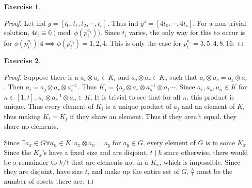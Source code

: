 \documentclass[11pt]{article}
\theoremstyle{definition}
\newtheorem{exercise}{{Exercise}}
\newcommand{\ind}{\text{ind }}
\begin{document}
\begin{exercise}
	\begin{proof}
		Let \(\ind y = [t_0, t_1, t_2, \cdots , t_s] \). Thus \(\ind y^4 = [4t_0, \cdots, 4t_s] \). For a non-trivial solution, \(4t_i \equiv 0 \pmod{\phi(p_i^{a_i})} \). Since \(t_i \) varies, the only way for this to occur is for \(\phi(p_i^{a_i})|4 \implies \phi(p_i^{a_i}) = 1,2,4 \). This is only the case for \(p_i^{a_i}=3,5,4,8,16 \).
	\end{proof}
\end{exercise}

\begin{exercise}
	\begin{proof}
		Suppose there is a \(a_i\otimes a_s \in K_i \) and \(a_j\otimes a_r \in K_j \) such that \(a_i \otimes a_s = a_j\otimes a_r \). Then \(a_i = a_j \otimes a_r \otimes a_s^{-1} \). Thus \(K_i = \{a_j \otimes a_r \otimes a_s^{-1} \otimes a_1 \cdots  \). Since \(a_r, a_s, a_n \in K\) for \(n \in [1, t]\), \(a_r \otimes a_s^{-1} \otimes a_n \in K \). It is trivial to see that for all  \(n \), this product is unique. Thus every element of \(K_i \) is a unique product of \(a_j \) and an element of \(K \), thus making \(K_i =K_j \) if they share an element. Thus if they aren't equal, they share no elements.

		Since \(\exists a_x \in G \forall a_n \in K: a_x \otimes a_n = a_y\) for \(a_y \in G \), every element of \(G \) is in some \(K_x \). Since the \(K_x \)'s  have a fixed size and are disjoint, \(t\mid h \) since otherwise, there would be a remainder to \(h/t \) that are elements not in a \(K_x \), which is impossible. Since they are disjoint, have size \(t \), and make up the entire set of \(G \), \(\frac{h}{t} \) must be the number of cosets there are.
	\end{proof}
\end{exercise}
\end{document}
